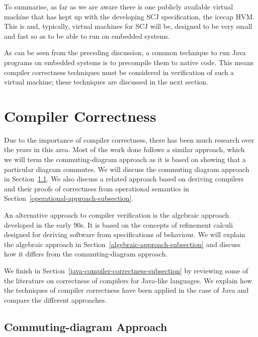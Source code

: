 \documentclass[a4paper,10pt]{report}
\begin{document}
To summarise, as far as we are aware there is one publicly available
virtual machine that has kept up with the developing SCJ
specification, the icecap HVM.
This is and, typically, virtual machines for SCJ will be, designed to
be very small and fast so as to be able to run on embedded systems.

As can be seen from the preceding discussion, a common technique to
run Java programs on embedded systems is to precompile them to native
code.
This means compiler correctness techniques must be considered in
verification of such a virtual machine; these techniques are discussed
in the next section.

\section{Compiler Correctness}
\label{compiler-correctness-section}


Due to the importance of compiler correctness, there has been much
research over the years in this area.
Most of the work done follows a similar approach, which we will term
the commuting-diagram approach as it is based on showing that a
particular diagram commutes.
We will discuss the commuting diagram approach in
Section~\ref{commuting-diagram-subsection}.
We also discuss a related approach based on deriving compilers and
their proofs of correctness from operational semantics in
Section~\ref{operational-approach-subsection}.

An alternative approach to compiler verification is the algebraic
approach developed in the early 90s.
It is based on the concepts of refinement calculi designed for
deriving software from specifications of behaviour.
We will explain the algebraic approach in
Section~\ref{algebraic-approach-subsection} and discuss how it differs
from the commuting-diagram approach.

We finish in Section~\ref{java-compiler-correctness-subsection} by
reviewing some of the literature on correctness of compilers for
Java-like languages.
We explain how the techniques of compiler correctness have been
applied in the case of Java and compare the different approaches.

\subsection{Commuting-diagram Approach}
\label{commuting-diagram-subsection}
\end{document}
